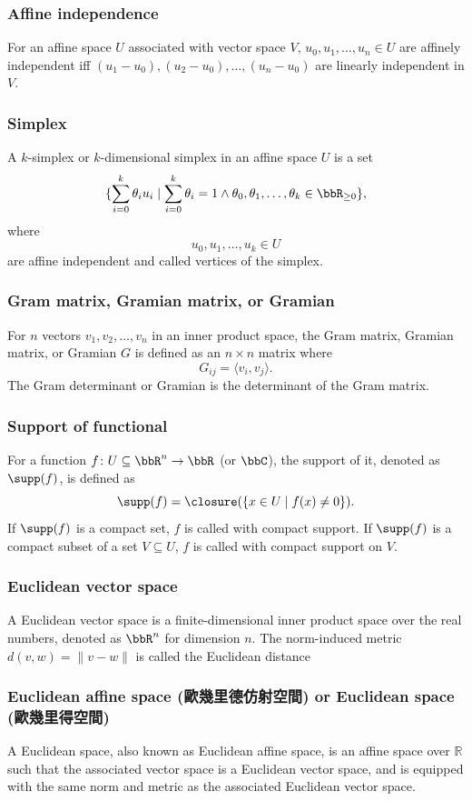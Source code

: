\documentclass[a4paper,12pt]{report}
\begin{document}
\subsubsection{Affine independence}
For an affine space $U$ associated with vector space $V$, $u_0,u_1,\ldots,u_n\in U$ are affinely independent iff $(u_1-u_0),(u_2-u_0),\ldots,(u_n-u_0)$ are linearly independent in $V$.
\subsubsection{Simplex}
A $k$-simplex or $k$-dimensional simplex in an affine space $U$ is a set
\[\{\sum_{i=0}^k\theta_iu_i\mid\sum_{i=0}^k\theta_i=1\land\theta_0,\theta_1,\ldots,\theta_k\in\bbR_{\ge 0}\},\]
where
\[u_0,u_1,\ldots,u_k\in U\]
are affine independent and called vertices of the simplex.
\subsubsection{Gram matrix, Gramian matrix, or Gramian}
For $n$ vectors $v_1,v_2,\ldots,v_n$ in an inner product space, the Gram matrix, Gramian matrix, or Gramian $G$ is defined as an $n\times n$ matrix where
\[G_{ij}=\langle v_i,v_j\rangle.\]
The Gram determinant or Gramian is the determinant of the Gram matrix.
\subsubsection{Support of functional}
For a function $f\colon U\subseteq\bbR^n\to\bbR$ (or $\bbC$), the support of it, denoted as $\supp(f)$, is defined as
\[\supp(f)=\closure(\{x\in U\mid f(x)\neq 0\}).\]
If $\supp(f)$ is a compact set, $f$ is called with compact support. If $\supp(f)$ is a compact subset of a set $V\subseteq U$, $f$ is called with compact support on $V$.
\subsubsection{Euclidean vector space}
A Euclidean vector space is a finite-dimensional inner product space over the real numbers, denoted as $\bbR^n$ for dimension $n$. The norm-induced metric $d(v,w)=\|v-w\|$ is called the Euclidean distance
\subsubsection{Euclidean affine space (歐幾里德仿射空間) or Euclidean space (歐幾里得空間)}
A Euclidean space, also known as Euclidean affine space, is an affine space over $\mathbb{R}$ such that the associated vector space is a Euclidean vector space, and is equipped with the same norm and metric as the associated Euclidean vector space.
\end{document}
